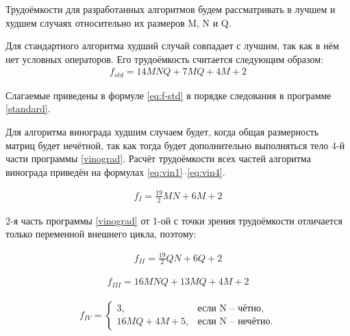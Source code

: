 Трудоёмкости для разработанных алгоритмов будем рассматривать в лучшем и худшем случаях относительно их размеров  M, N и Q.

Для стандартного алгоритма худший случай совпадает с лучшим, так как в нём нет условных операторов. Его трудоёмкость считается следующим образом:
\begin{equation}
	\label{eq:f-std}
	\begin{matrix}
		f_{std} = 14MNQ + 7MQ + 4M + 2
	\end{matrix}
\end{equation}

Слагаемые приведены в формуле \ref{eq:f-std} в порядке следования в программе \ref{standard}.

Для алгоритма винограда худшим случаем будет, когда общая размерность матриц будет нечётной, так как тогда будет дополнительно выполняться тело 4-й части программы \ref{vinograd}. Расчёт трудоёмкости всех частей алгоритма винограда приведён на формулах \ref{eq:vin1}–\ref{eq:vin4}.

\begin{equation}
	\label{eq:vin1}
	\begin{matrix}
		f_{I} = \frac{19}{2}MN + 6M + 2 
	\end{matrix}
\end{equation}

2-я часть программы \ref{vinograd} от 1-ой с точки зрения трудоёмкости отличается только переменной внешнего цикла, поэтому:

\begin{equation}
	\label{eq:vin2}
	\begin{matrix}
		f_{II} = \frac{19}{2}QN + 6Q + 2 
	\end{matrix}
\end{equation}

\begin{equation}
	\label{eq:vin3}
	\begin{matrix}
		f_{III} = 16MNQ + 13MQ + 4M + 2
	\end{matrix}
\end{equation}

\begin{equation}
	\label{eq:vin4}
	\begin{matrix}
		f_{IV} = \begin{cases}
			3, &\text{если N – чётно}, \\
			16MQ + 4M + 5, &\text{если N – нечётно}.
		\end{cases}
	\end{matrix}
\end{equation}

